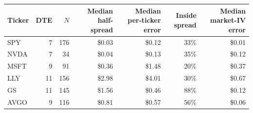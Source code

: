 \begin{tabular}{lrrrrrr}
\toprule
Ticker & DTE & $N$ & Median half-spread & Median per-ticker error & Inside spread & Median market-IV error \\
\midrule
SPY & 7 & 176 & \$0.03 & \$0.12 & 33\% & \$0.01 \\
NVDA & 7 & 34 & \$0.04 & \$0.13 & 35\% & \$0.12 \\
MSFT & 9 & 91 & \$0.36 & \$1.48 & 20\% & \$0.37 \\
LLY & 11 & 156 & \$2.98 & \$4.01 & 30\% & \$0.67 \\
GS & 11 & 145 & \$1.56 & \$0.46 & 88\% & \$0.12 \\
AVGO & 9 & 116 & \$0.81 & \$0.57 & 56\% & \$0.06 \\
\bottomrule
\end{tabular}
